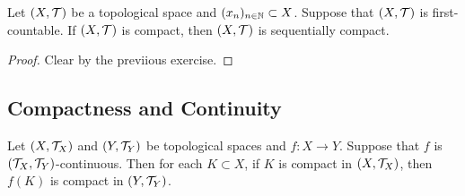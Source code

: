 \documentclass{book}
\begin{document}
 \begin{ex} 
 	Let $(X, \mathcal{T})$ be a topological space and $(x_n)_{n \in \mathbb{N}} \subset X$. Suppose that $(X, \mathcal{T})$ is first-countable. If $(X, \mathcal{T})$ is compact, then $(X, \mathcal{T})$ is sequentially compact.
 \end{ex}

\begin{proof}
	Clear by the previious exercise. 
\end{proof}
 
 
 
 
 
 
 
 
 
 
 
 
 
 
 
 
 
 
 
 
 
 
 
 
 
 
 
 
 
 
 
 
 
 
 
 
 
 \subsection{Compactness and Continuity} 
 
 \begin{ex} 
	Let $(X, \mathcal{T}_X)$ and $(Y, \mathcal{T}_Y)$ be topological spaces and $f: X \rightarrow Y$. Suppose that $f$ is $(\mathcal{T}_X, \mathcal{T}_Y)$-continuous. Then for each $K \subset X$, if $K$ is compact in $(X, \mathcal{T}_X)$, then $f(K)$ is compact in $(Y, \mathcal{T}_Y)$. 
\end{ex}
\end{document}
